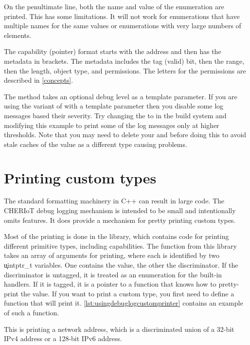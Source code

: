 {On the penultimate line, both the name and value of the enumeration are printed.
This has some limitations.
It will not work for enumerations that have multiple names for the same values or enumerations with very large numbers of elements.

The capability (pointer) format starts with the address and then has the metadata in brackets.
The metadata includes the tag (valid) bit, then the range, then the length, object type, and permissions.
The letters for the permissions are described in \ref{concepts}.

The  method takes an optional debug level as a template parameter.
If you are using the variant of  with a  template parameter then you disable some log messages based their severity.
Try changing the  to  in the build system and modifying this example to print some of the log messages only at higher thresholds.
Note that you may need to delete your  and  before doing this to avoid stale caches of the value as a different type causing problems.

\section{Printing custom types}

The standard formatting machinery in C++ can result in large code.
The CHERIoT debug logging mechanism is intended to be small and intentionally omits features.
It does provide a mechanism for pretty printing custom types.

Most of the printing is done in the  library, which contains code for printing different primitive types, including capabilities.
The function from this library takes an array of arguments for printing, where each is identified by two \c{uintptr_t} variables.
One contains the value, the other the discriminator.
If the discriminator is untagged, it is treated as an enumeration for the built-in handlers.
If it is tagged, it is a pointer to a function that knows how to pretty-print the value.
If you want to print a custom type, you first need to define a function that will print it.
\ref{lst:usingdebuglogcustomprinter} contains an example of such a function.

This is printing a network address, which is a discriminated union of a 32-bit IPv4 address or a 128-bit IPv6 address.

\codelisting[filename=examples/debug_helpers/example.cc,marker=printer,label=lst:usingdebuglogcustomprinter,caption="Defining a print function for a custom type."]{}

}
